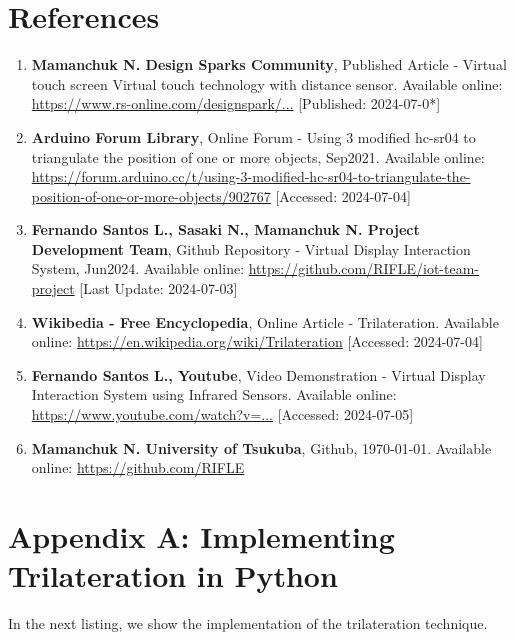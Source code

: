 \documentclass[12pt,a4paper]{article}
\begin{document}
\section*{References}
\begin{enumerate}
    \item \textbf{Mamanchuk N. Design Sparks Community}, Published Article - Virtual touch screen Virtual touch technology with distance sensor. Available online: \url{https://www.rs-online.com/designspark/...} [Published: 2024-07-0*]
    \item \textbf{Arduino Forum Library}, Online Forum - Using 3 modified hc-sr04 to triangulate the position of one or more objects, Sep2021. Available online: \url{https://forum.arduino.cc/t/using-3-modified-hc-sr04-to-triangulate-the-position-of-one-or-more-objects/902767} [Accessed: 2024-07-04]
    \item \textbf{Fernando Santos L., Sasaki N., Mamanchuk N. Project Development Team}, Github Repository - Virtual Display Interaction System, Jun2024. Available online: \url{https://github.com/RIFLE/iot-team-project} [Last Update: 2024-07-03]
    \item \textbf{Wikibedia - Free Encyclopedia}, Online Article - Trilateration. Available online: \url{https://en.wikipedia.org/wiki/Trilateration} [Accessed: 2024-07-04]
    \item \textbf{Fernando Santos L., Youtube}, Video Demonstration - Virtual Display Interaction System using Infrared Sensors. Available online: \url{https://www.youtube.com/watch?v=...} [Accessed: 2024-07-05]
    \item \textbf{Mamanchuk N. University of Tsukuba}, Github, \today. Available online: \url{https://github.com/RIFLE}
\end{enumerate}



\newpage
\section*{Appendix A: Implementing Trilateration in Python}
In the next listing, we show the implementation of the trilateration technique.
\end{document}

